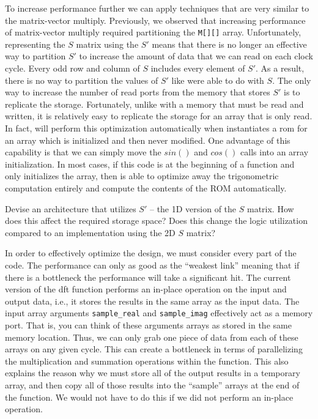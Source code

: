 To increase performance further we can apply techniques that are very similar to the matrix-vector multiply.  Previously, we observed that increasing performance of matrix-vector multiply required partitioning the \lstinline|M[][]| array.  Unfortunately, representing the $S$ matrix using the $S'$ means that there is no longer an effective way to partition $S'$ to increase the amount of data that we can read on each clock cycle. Every odd row and column of $S$ includes every element of $S'$.  As a result, there is no way to partition the values of $S'$ like were able to do with $S$.  The only way to increase the number of read ports from the memory that stores $S'$ is to replicate the storage.  Fortunately, unlike with a memory that must be read and written, it is relatively easy to replicate the storage for an array that is only read.  In fact, \VHLS will perform this optimization automatically when instantiates a \gls{rom} for an array which is initialized and then never modified.  One advantage of this capability is that we can simply move the $sin()$ and $cos()$ calls into an array initialization.  In most cases, if this code is at the beginning of a function and only initializes the array, then \VHLS is able to optimize away the trigonometric computation entirely and compute the contents of the ROM automatically.

\begin{exercise}
Devise an architecture that utilizes $S'$ -- the 1D version of the $S$ matrix. How does this affect the required storage space? Does this change the logic utilization compared to an implementation using the 2D $S$ matrix? 
\end{exercise}

In order to effectively optimize the design, we must consider every part of the code. The performance can only as good as the ``weakest link'' meaning that if there is a bottleneck the performance will take a significant hit. The current version of the \gls{dft} function performs an in-place operation on the input and output data, i.e., it stores the results in the same array as the input data. The input array arguments \lstinline|sample_real| and \lstinline|sample_imag| effectively act as a memory port. That is, you can think of these arguments arrays as stored in the same memory location. Thus, we can only grab one piece of data from each of these arrays on any given cycle. This can create a bottleneck in terms of parallelizing the multiplication and summation operations within the function. This also explains the reason why we must store all of the output results in a temporary array, and then copy all of those results into the ``sample'' arrays at the end of the function. We would not have to do this if we did not perform an in-place operation. 

